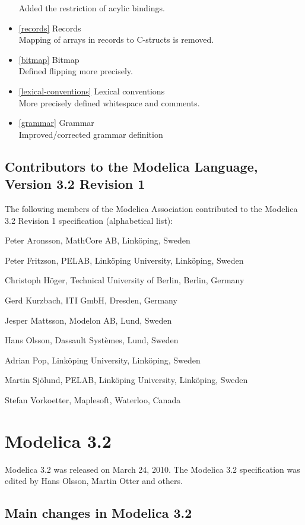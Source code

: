 \documentclass[10pt,a4paper]{report}
\def\doublelabel#1{\label{#1}}
\begin{document}
\begin{itemize}
  Added the restriction of acylic bindings.
\item
  \ref{records} Records\\
  Mapping of arrays in records to C-structs is removed.
\item
  \ref{bitmap} Bitmap\\
  Defined flipping more precisely.
\item
  \ref{lexical-conventions} Lexical conventions\\
  More precisely defined whitespace and comments.
\item
  \ref{grammar} Grammar\\
  Improved/corrected grammar definition
\end{itemize}

\subsection{Contributors to the Modelica Language, Version 3.2 Revision 1}\doublelabel{contributors-to-the-modelica-language-version-3-2-revision-1}

The following members of the Modelica Association contributed to the
Modelica 3.2 Revision 1 specification (alphabetical list):

Peter Aronsson, MathCore AB, Linköping, Sweden

Peter Fritzson, PELAB, Linköping University, Linköping, Sweden

Christoph Höger, Technical University of Berlin, Berlin, Germany

Gerd Kurzbach, ITI GmbH, Dresden, Germany

Jesper Mattsson, Modelon AB, Lund, Sweden

Hans Olsson, Dassault Systèmes, Lund, Sweden

Adrian Pop, Linköping University, Linköping, Sweden

Martin Sjölund, PELAB, Linköping University, Linköping, Sweden

Stefan Vorkoetter, Maplesoft, Waterloo, Canada

\section{Modelica 3.2}\doublelabel{modelica-3-2}

Modelica 3.2 was released on March 24, 2010. The Modelica 3.2
specification was edited by Hans Olsson, Martin Otter and others.

\subsection{Main changes in Modelica 3.2}\doublelabel{main-changes-in-modelica-3-2}
\end{document}
